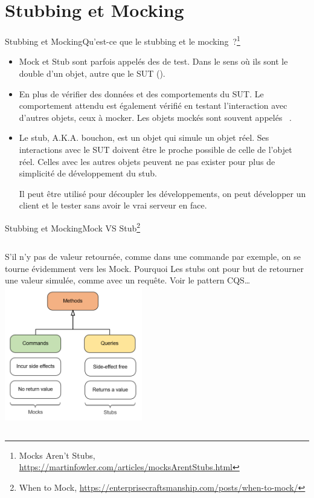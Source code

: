 \documentclass{beamer}
\begin{document}
    \section{Stubbing et Mocking}\label{sec:stub-mock}

    \begin{frame}{Stubbing et Mocking}{Qu'est-ce que le stubbing et le mocking~?\footnote{\label{fowler-stub-mock}Mocks Aren't Stubs, \url{https://martinfowler.com/articles/mocksArentStubs.html}}}
        \begin{itemize}
            \item Mock et Stub sont parfois appelés des  de test.
            Dans le sens où ils sont le double d'un objet, autre que le SUT ().
            \item En plus de vérifier des données et des comportements du SUT.
            Le comportement attendu est également vérifié en testant l'interaction avec d'autres objets, ceux à mocker.
            Les objets mockés sont souvent appelés ~.
            \item Le stub, A.K.A. bouchon, est un objet qui simule un objet réel.
            Ses interactions avec le SUT doivent être le proche possible de celle de l'objet réel.
            Celles avec les autres objets peuvent ne pas exister pour plus de simplicité de développement du stub.

            Il peut être utilisé pour découpler les développements, on peut développer un client et le tester sans avoir le vrai serveur en face.
        \end{itemize}
    \end{frame}

    \begin{frame}{Stubbing et Mocking}{Mock VS Stub\footnote{When to Mock, \url{https://enterprisecraftsmanship.com/posts/when-to-mock/}}}
        \begin{columns}
            S'il n'y pas de valeur retournée, comme dans une commande par exemple, on se tourne évidemment vers les Mock. Pourquoi 
            \bigbreak
            Les stubs ont pour but de retourner une valeur simulée, comme avec un requête.
            \bigbreak
            Voir le pattern CQS\ldots
            \centering
            \includegraphics[width=6cm]{image/mock-vs-stub-1}
        \end{columns}
    \end{frame}
\end{document}
